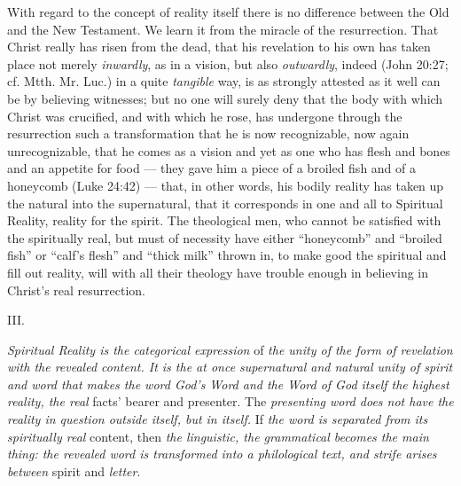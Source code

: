 \documentclass[12pt,a4paper,openany]{book}
\newcommand{\opage}[1]{\marginnote{\footnotesize\textit{[#1]}}}
\begin{document}
With regard to the concept of reality itself there is
no difference between the Old and the New Testament.
We learn it from the miracle of the resurrection. That Christ really
\setcounter{footnote}{0}%
\opage{11}has risen from the dead, that his revelation to his own
has taken place not merely \emph{inwardly}, as in a vision, but also
\emph{outwardly}, indeed (John 20:27; cf. Mtth. Mr. Luc.) in
a quite \emph{tangible} way, is as strongly attested as
it well can be by believing witnesses; but no one will surely
deny that the body with which Christ was crucified, and with which he rose, has undergone through the resurrection
such a transformation that he is now recognizable,
now again unrecognizable, that he comes as a vision and
yet as one who has flesh and bones and an appetite for food
--- they gave him a piece of a broiled fish and of
a honeycomb (Luke 24:42) --- that, in other words,
his bodily reality has taken up the natural into
the supernatural, that it corresponds in one and all to Spiritual Reality,
reality for the spirit. The theological men, who
cannot be satisfied with the spiritually real, but
must of necessity have either ``honeycomb'' and ``broiled
fish'' or ``calf's flesh'' and ``thick milk'' thrown in, to
make good the spiritual and fill out reality, will
with all their theology have trouble enough in believing
in Christ's real resurrection.

\begin{center}III.\end{center}

\emph{Spiritual Reality is the categorical expression}
of \emph{the unity of the form of revelation with the
revealed content. It is the at once
supernatural and natural unity of spirit and
word that makes the word God's Word and the Word of God
itself the highest reality, the real} facts' bearer and presenter. The
\emph{presenting word does not have the reality in question
\setcounter{footnote}{0}%
\opage{12}outside itself, but in itself.} If
\emph{the word is separated from its spiritually real} content, then \emph{the
linguistic, the grammatical becomes the main thing:
the revealed word is transformed into a
philological text, and strife arises between}
spirit and \emph{letter}.
\end{document}
